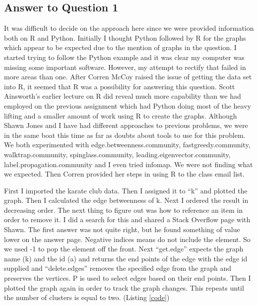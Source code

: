 \documentclass{article}
\begin{document}
\subsection*{Answer to Question 1}

It was difficult to decide on the approach here since we were provided information both on R and Python. Initially I thought Python followed by R for the graphs which appear to be expected due to the mention of graphs in the question. I started trying to follow the Python example and it was clear my computer was missing some important software. However, my attempt to rectify that failed in more areas than one. After Corren McCoy raised the issue of getting the data set into R, it seemed that R was a possibility for answering this question. Scott Ainsworth's earlier lecture on R did reveal much more capability than we had employed on the previous assignment which had Python doing most of the heavy lifting and a smaller amount of work using R to create the graphs. Although Shawn Jones and I have had different approaches to previous problems, we were in the same boat this time as far as doubts about tools to use for this problem. We both experimented with edge.betweenness.community, fastgreedy.community, walktrap.community, spinglass.community, leading.eigenvector.community, label.propagation.community and I even tried infomap. We were not finding what we expected. Then Corren provided her steps in using R to the class email list.


First I imported the karate club data. Then I assigned it to ``k'' and plotted the graph. Then I calculated the edge betweenness of k. Next I ordered the result in decreasing order. The next thing to figure out was how to reference an item in order to remove it. I did a search for this and shared a Stack Overflow page with Shawn. The first answer was not quite right, but he found something of value lower on the answer page. Negative indices means do not include the element. So we used -1 to pop the element off the front. Next ``get.edge'' expects the graph name (k) and the id (a) and returns the end points of the edge with the edge id supplied and ``delete.edges'' removes the specified edge from the graph and preserves the vertices. P is used to select edges based on their end points. Then I plotted the graph again in order to track the graph changes. This repeats until the number of clusters is equal to two. (Listing \ref{code})
\end{document}
